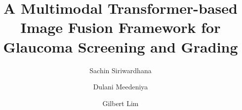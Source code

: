 \documentclass[preprint,12pt]{elsarticle}
\begin{document}
\begin{frontmatter}



     \title{A Multimodal Transformer-based Image Fusion Framework for Glaucoma Screening and Grading}


     \author[auth1]{Sachin Siriwardhana} %
     \author[auth1]{Dulani Meedeniya} %
     \author[auth2]{Gilbert Lim} %
     \address[auth1]{Department of Computer Science \& Engineering, University of Moratuwa, Moratuwa 10400, Sri Lanka}
     \address[auth2]{SingHealth AI Health Program, SingHealth Group, Singapore 168582}



\end{frontmatter}
\end{document}
